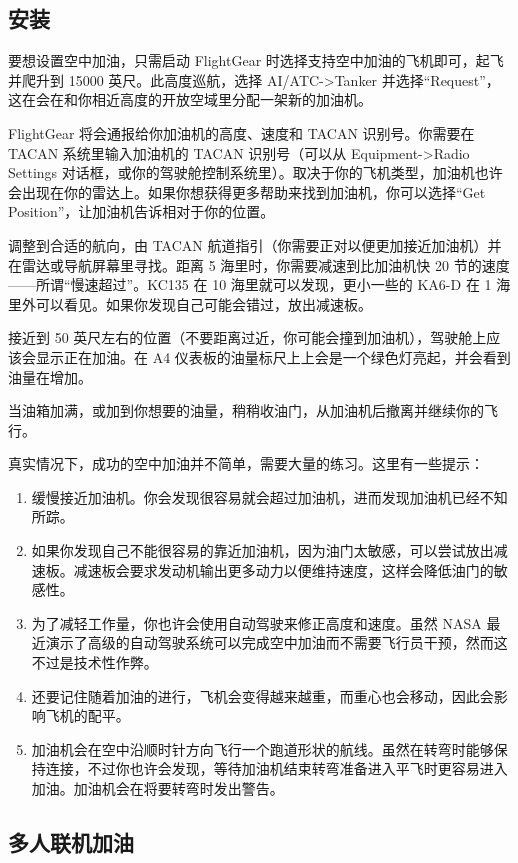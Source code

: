 \subsection{安装}

要想设置空中加油，只需启动 FlightGear 时选择支持空中加油的飞机即可，起飞并爬升到 15000 英尺。此高度巡航，选择 AI/ATC->Tanker 并选择“Request”，这在会在和你相近高度的开放空域里分配一架新的加油机。

FlightGear 将会通报给你加油机的高度、速度和 TACAN 识别号。你需要在 TACAN 系统里输入加油机的 TACAN 识别号（可以从 Equipment->Radio Settings 对话框，或你的驾驶舱控制系统里）。取决于你的飞机类型，加油机也许会出现在你的雷达上。如果你想获得更多帮助来找到加油机，你可以选择“Get Position”，让加油机告诉相对于你的位置。

调整到合适的航向，由 TACAN 航道指引（你需要正对以便更加接近加油机）并在雷达或导航屏幕里寻找。距离 5 海里时，你需要减速到比加油机快 20 节的速度——所谓“慢速超过”。KC135 在 10 海里就可以发现，更小一些的 KA6-D 在 1 海里外可以看见。如果你发现自己可能会错过，放出减速板。

接近到 50 英尺左右的位置（不要距离过近，你可能会撞到加油机），驾驶舱上应该会显示正在加油。在 A4 仪表板的油量标尺上上会是一个绿色灯亮起，并会看到油量在增加。

当油箱加满，或加到你想要的油量，稍稍收油门，从加油机后撤离并继续你的飞行。

真实情况下，成功的空中加油并不简单，需要大量的练习。这里有一些提示：

\begin{enumerate}
\item 缓慢接近加油机。你会发现很容易就会超过加油机，进而发现加油机已经不知所踪。
\item 如果你发现自己不能很容易的靠近加油机，因为油门太敏感，可以尝试放出减速板。减速板会要求发动机输出更多动力以便维持速度，这样会降低油门的敏感性。
\item 为了减轻工作量，你也许会使用自动驾驶来修正高度和速度。虽然 NASA 最近演示了高级的自动驾驶系统可以完成空中加油而不需要飞行员干预，然而这不过是技术性作弊。
\item 还要记住随着加油的进行，飞机会变得越来越重，而重心也会移动，因此会影响飞机的配平。
\item 加油机会在空中沿顺时针方向飞行一个跑道形状的航线。虽然在转弯时能够保持连接，不过你也许会发现，等待加油机结束转弯准备进入平飞时更容易进入加油。加油机会在将要转弯时发出警告。
\end{enumerate}

\subsection{多人联机加油}

